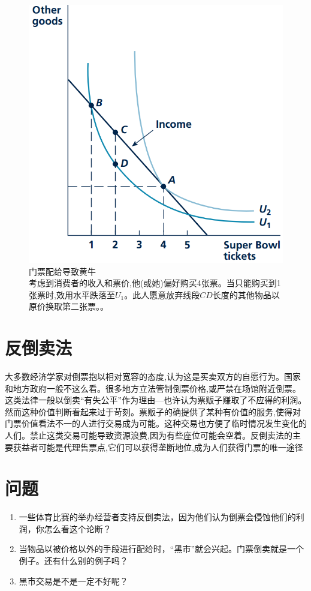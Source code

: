 \documentclass[10pt, a4paper]{ctexart} %
\begin{document}
\begin{figure}[ht]
	\centering
	\includegraphics[scale=0.6]{fig//ticket.png} %
	\caption{门票配给导致黄牛\\考虑到消费者的收入和票价,他(或她)偏好购买4张票。当只能购买到1张票时,效用水平跌落至$U_1$。此人愿意放弃线段$CD$长度的其他物品以原价换取第二张票。。} %
	\label{ticket} %
\end{figure}

\section*{反倒卖法}
大多数经济学家对倒票抱以相对宽容的态度,认为这是买卖双方的自愿行为。国家和地方政府一般不这么看。很多地方立法管制倒票价格,或严禁在场馆附近倒票。这类法律一般以倒卖“有失公平”作为理由—也许认为票贩子赚取了不应得的利润。然而这种价值判断看起来过于苛刻。票贩子的确提供了某种有价值的服务,使得对门票价值看法不一的人进行交易成为可能。这种交易也方便了临时情况发生变化的人们。禁止这类交易可能导致资源浪费,因为有些座位可能会空着。反倒卖法的主要获益者可能是代理售票点,它们可以获得垄断地位,成为人们获得门票的唯一途径



\section*{问题}
\begin{enumerate}
	\item 一些体育比赛的举办经营者支持反倒卖法，因为他们认为倒票会侵蚀他们的利润，你怎么看这个论断？
	\item 当物品以被价格以外的手段进行配给时，“黑市”就会兴起。门票倒卖就是一个例子。还有什么别的例子吗？	
	\item 黑市交易是不是一定不好呢？
	
\end{enumerate}
\end{document}
